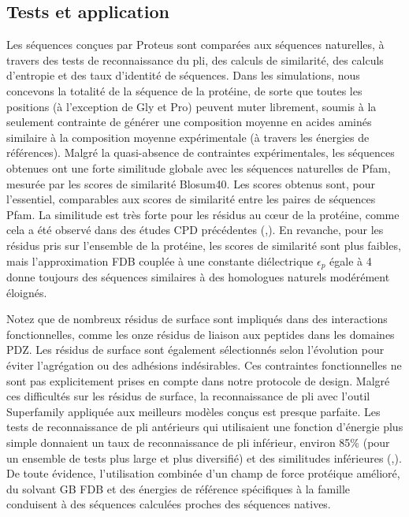 \subsection{Tests et application}
Les séquences conçues par Proteus sont comparées aux séquences naturelles, à travers des tests de reconnaissance du pli, des calculs de similarité, des calculs d'entropie et des taux d'identité de séquences. Dans les simulations, nous concevons la totalité de la séquence de la protéine, de sorte que toutes les positions  (à l'exception de Gly et Pro) peuvent muter librement, soumis à la seulement contrainte de générer une composition moyenne en acides aminés similaire à la composition moyenne expérimentale (à travers les énergies de références). Malgré la quasi-absence de contraintes expérimentales, les séquences obtenues ont une forte similitude globale avec les séquences naturelles de Pfam, mesurée par les scores de similarité Blosum40. Les scores obtenus sont, pour l'essentiel, comparables aux scores de similarité entre les paires de séquences Pfam. La similitude est très forte pour les résidus au cœur de la protéine, comme cela a été observé dans des études CPD précédentes (\cite{30},\cite{72}). En revanche, pour les résidus pris sur l'ensemble de la protéine, les scores de similarité sont plus faibles, mais l'approximation FDB couplée à une constante diélectrique $\epsilon_p$ égale à 4 donne toujours des séquences similaires à des homologues naturels modérément éloignés.

Notez que de nombreux résidus de surface sont impliqués dans des interactions fonctionnelles, comme les onze résidus de liaison aux peptides dans les domaines PDZ. Les résidus de surface sont également sélectionnés selon l'évolution pour éviter l'agrégation ou des adhésions indésirables. Ces contraintes fonctionnelles ne sont pas explicitement prises en compte dans notre protocole de design.  Malgré ces difficultés sur les résidus de surface, la reconnaissance de pli avec l'outil Superfamily  appliquée aux meilleurs modèles conçus est presque parfaite. Les tests de reconnaissance de pli antérieurs qui utilisaient une fonction d'énergie plus simple donnaient un taux de reconnaissance de pli inférieur, environ 85\% (pour un ensemble de tests plus large et plus diversifié) et des similitudes inférieures (\cite{15},\cite{50}). De toute évidence, l'utilisation combinée d'un champ de force protéique amélioré, du solvant GB FDB et des énergies de référence spécifiques à la famille conduisent à des séquences calculées proches des séquences natives.

